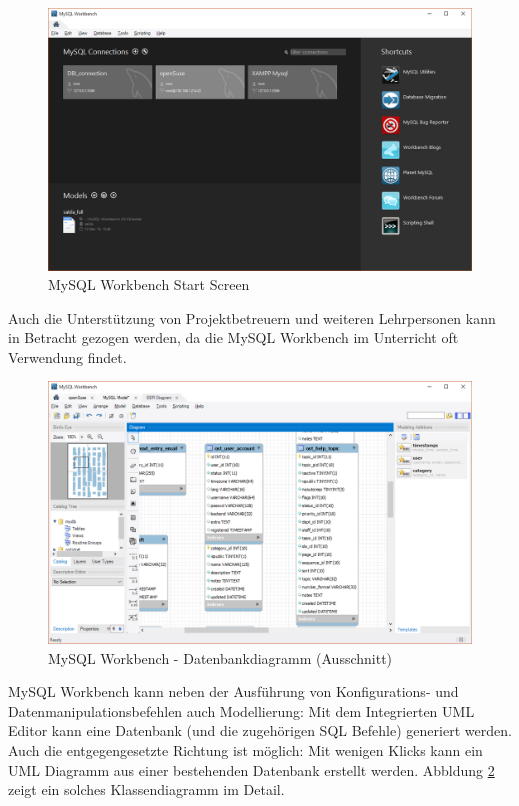 	\begin{figure}[h]
		\centering
		\includegraphics[scale=.5]{figures/workbench_startgui.png}
		\caption{MySQL Workbench Start Screen}
		\label{Worbench_Startgui}
	\end{figure}

	Auch die Unterstützung von Projektbetreuern und weiteren Lehrpersonen kann in Betracht gezogen werden, da die MySQL Workbench im Unterricht oft Verwendung findet.
	
	

	\begin{figure}[h]
		\centering
		\includegraphics[scale=.5]{figures/workbench_reverse.png}
		\caption{MySQL Workbench - Datenbankdiagramm (Ausschnitt)}
		\label{Workbench_DiaGUI}
	\end{figure}
		
	MySQL Workbench kann neben der Ausführung von Konfigurations- und Datenmanipulationsbefehlen auch Modellierung: Mit dem Integrierten UML Editor kann eine Datenbank (und die zugehörigen SQL Befehle) generiert werden. Auch die entgegengesetzte Richtung ist möglich: Mit wenigen Klicks kann ein UML Diagramm aus einer bestehenden Datenbank erstellt werden. Abbldung \ref{Workbench_DiaGUI} zeigt ein solches Klassendiagramm im Detail.
	
